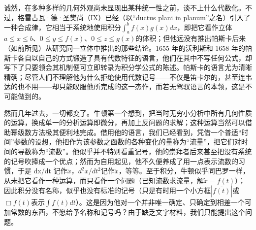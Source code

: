诚然，在多种多样的几何外观尚未显现出某种统一性之前，谈不上什么代数化。不过，格雷古瓦·德·圣樊尚（IX）已经（以“ductus plani in planum”之名）引入了一种合成律，它相当于系统地使用积分\(\int_{a}^{b}f(x)g(x)dx\)，即把它看作立体\(a \leqslant x \leqslant b\)、\(0 \leqslant y \leqslant f(x)\)、\(0 \leqslant z \leqslant g(x)\)的体积；但他远没有推出帕斯卡后来（如前所见）从研究同一立体中推出的那些结论。1655 年的沃利斯和 1658 年的帕斯卡各自以自己的方式锻造了具有代数特征的语言，他们在其中不写任何公式，却写下了只要领会其机制便可立即转录为积分学公式的陈述。帕斯卡的语言尤为清晰精确；尽管人们不理解他为什么拒绝使用代数记号——不仅是笛卡尔的，甚至连韦达的也不用——却只能叹服他所完成的这一杰作，而若无驾驭语言的本领，这是不可能做到的。

然而几年过去，一切都变了。牛顿第一个想到，把当时无穷小分析中所有几何性质的运算，换成单一的分析运算即微分，再加上反问题的求解；这种运算当然可以借助幂级数方法极其便利地完成。借用他的语言，我们已经看到，凭借一个普适“时间”参数的设想，他把作为该参数之函数的各种变化的量称为“流量”，把它们对时间的导数称为“流数”。他似乎并不特别看重记号，他的崇拜者后来甚至把没有系统的记号吹捧成一个优点；然而为自用起见，他不久便养成了用一点表示流数的习惯，于是 dx/dt 记作\(\dot{x}\)，\(d^{2}x/dt^{2}\)记作\(\ddot{x}\)，等等。至于积分，牛顿似乎同巴罗一样，从未把它看作一种运算，而只看作一个问题（已知流数求流量，解\(\dot{x}=f(t)\)）；因此积分没有名称，似乎也没有标准的记号（只是有时用一个小方框\(\left|\overline{f(t)}\right|\)或\(\Box f(t)\)表示\(\int f(t)dt\)）。这是因为他对一个并非唯一确定、只确定到相差一个可加常数的东西，不愿给予名称和记号吗？由于缺乏文字材料，我们只能提出这个问题。

